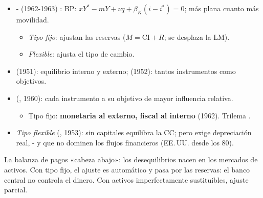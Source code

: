 \documentclass{article}
\begin{document}
\begin{columnas}
\begin{itemize}
\item {}- (1962-1963) : BP: $xY^*-mY+\nu q+\beta_K(i-i^*)=0$; más plana cuanto más movilidad.
  \begin{itemize}
  \item \emph{Tipo fijo}: ajustan las reservas ($M=\mathrm{CI}+R$; se desplaza la LM).
  \item \emph{Flexible}: ajusta el tipo de cambio.
  \end{itemize}
\end{itemize}
\begin{itemize}
\item {} (1951): equilibrio interno y externo;  (1952): tantos instrumentos como objetivos.
\item {} (, 1960): cada instrumento a su objetivo de mayor influencia relativa.
  \begin{itemize}
  \item Tipo fijo: \textbf{monetaria al externo, fiscal al interno} (1962). Trilema .
  \end{itemize}
\item \emph{Tipo flexible} (, 1953): sin capitales equilibra la CC; pero exige depreciación real, - y que no dominen los flujos financieros (EE.\,UU. desde los 80).
\end{itemize}

\begin{ideaclave}
La balanza de pagos «cabeza abajo»: los desequilibrios nacen en los mercados de activos. Con tipo fijo, el ajuste es automático y pasa por las reservas: el banco central no controla el dinero. Con activos imperfectamente sustituibles, ajuste parcial.
\end{ideaclave}


\end{columnas}
\end{document}
